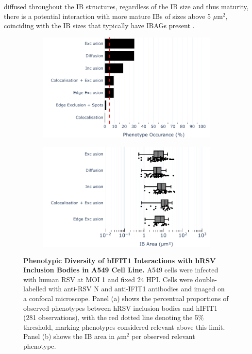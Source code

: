 diffused throughout the IB structures, regardless of the IB size and thus maturity, there is a potential interaction with more mature IBs of sizes above 5 \(\mu \mbox{m}^2\), coinciding with the IB sizes that typically have IBAGs present \cite{Rincheval2017FunctionalVirus}.

\begin{figure}
    \begin{subfigure}{0.495\textwidth}
        \caption{}
        \includegraphics[width=1\linewidth]{08. Chapter 3/Figs/02. Infection/01. IFIT1/01. bar_i1_a549.pdf} 
    \end{subfigure}
    \begin{subfigure}{0.495\textwidth}
        \caption{}
        \includegraphics[width=1\linewidth]{08. Chapter 3/Figs/02. Infection/01. IFIT1/02. box_i1_a549.pdf}
    \end{subfigure}
    \caption[Phenotypic Diversity of hIFIT1 Interactions with hRSV Inclusion Bodies in A549 Cell Line.]{\textbf{Phenotypic Diversity of hIFIT1 Interactions with hRSV Inclusion Bodies in A549 Cell Line.} A549 cells were infected with human RSV at MOI 1 and fixed 24 HPI. Cells were double-labelled with anti-RSV N and anti-IFIT1 antibodies and imaged on a confocal microscope. Panel (a) shows the percentual proportions of observed phenotypes between hRSV inclusion bodies and hIFIT1 (281 observations), with the red dotted line denoting the 5\% threshold, marking phenotypes considered relevant above this limit. Panel (b) shows the IB area in \(\mu \mbox{m}^2\) per observed relevant phenotype.}
    \label{fig:Phenotypic Diversity of hIFIT1 Interactions with hRSV Inclusion Bodies in A549 Cell Line}
\end{figure}

